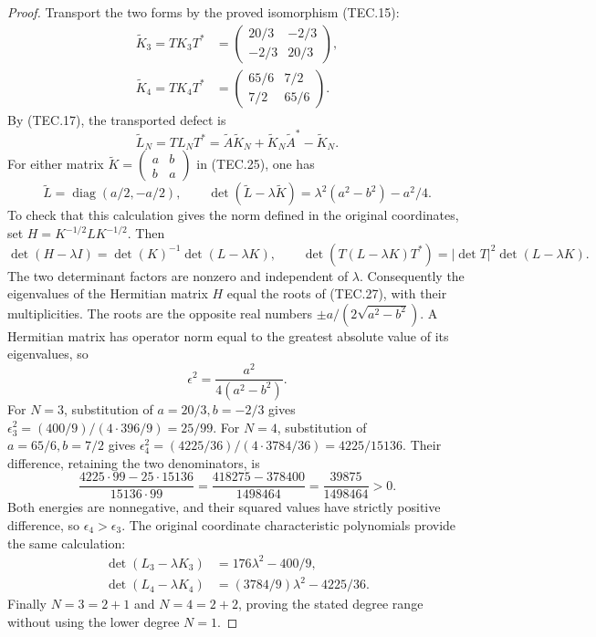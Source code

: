 \begin{proof}
Transport the two forms by the proved isomorphism (TEC.15):
\[
\begin{aligned}
 \widetilde K_3=TK_3T^*
     &=\begin{pmatrix}20/3&-2/3\\-2/3&20/3\end{pmatrix},\\
 \widetilde K_4=TK_4T^*
     &=\begin{pmatrix}65/6&7/2\\7/2&65/6\end{pmatrix}.
\end{aligned}                                                     \tag{TEC.25}
\]
By (TEC.17), the transported defect is
\[
 \widetilde L_N=TL_NT^*
 =\widetilde A\widetilde K_N+\widetilde K_N\widetilde A^*
                                      -\widetilde K_N.
                                                                    \tag{TEC.26}
\]
For either matrix \(\widetilde K=\begin{pmatrix}a&b\\b&a\end{pmatrix}\)
in (TEC.25), one has
\[
 \widetilde L=\operatorname{diag}(a/2,-a/2),\qquad
 \det(\widetilde L-\lambda\widetilde K)
       =\lambda^2(a^2-b^2)-a^2/4.                               \tag{TEC.27}
\]
To check that this calculation gives the norm defined in the original
coordinates, set \(H=K^{-1/2}LK^{-1/2}\).  Then
\[
 \det(H-\lambda I)=\det(K)^{-1}\det(L-\lambda K),\qquad
 \det(T(L-\lambda K)T^*)=|\det T|^2\det(L-\lambda K).
                                                                    \tag{TEC.28}
\]
The two determinant factors are nonzero and independent of
\(\lambda\).  Consequently the eigenvalues of the Hermitian matrix
\(H\) equal the roots of (TEC.27), with their multiplicities.  The
roots are the opposite real numbers
\(\pm a/(2\sqrt{a^2-b^2})\).  A Hermitian matrix has operator norm
equal to the greatest absolute value of its eigenvalues, so
\[
 \epsilon^2=\frac{a^2}{4(a^2-b^2)}.                              \tag{TEC.29}
\]
For \(N=3\), substitution of \(a=20/3,b=-2/3\) gives
\(\epsilon_3^2=(400/9)/(4\cdot396/9)=25/99\).
For \(N=4\), substitution of \(a=65/6,b=7/2\) gives
\(\epsilon_4^2=(4225/36)/(4\cdot3784/36)=4225/15136\).
Their difference, retaining the two denominators, is
\[
 \frac{4225\cdot99-25\cdot15136}{15136\cdot99}
   =\frac{418275-378400}{1498464}
   =\frac{39875}{1498464}>0.                                   \tag{TEC.30}
\]
Both energies are nonnegative, and their squared values have strictly
positive difference, so \(\epsilon_4>\epsilon_3\).  The original
coordinate characteristic polynomials provide the same calculation:
\[
\begin{aligned}
 \det(L_3-\lambda K_3)&=176\lambda^2-400/9,\\
 \det(L_4-\lambda K_4)&=(3784/9)\lambda^2-4225/36.
\end{aligned}                                                     \tag{TEC.31}
\]
Finally \(N=3=2+1\) and \(N=4=2+2\), proving the stated degree
range without using the lower degree \(N=1\).
\end{proof}

